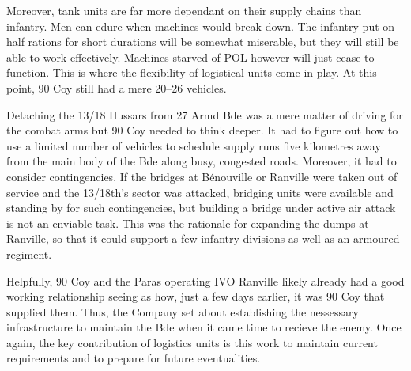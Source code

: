 \documentclass[noraggedright]{turabian-researchpaper}
\begin{document}
Moreover, tank units are far more dependant on their supply chains than infantry.
Men can edure when machines would break down.  The infantry put on half rations 
for short durations will be somewhat miserable, but they will still be able to
work effectively.  Machines starved of POL however will just cease to function.
This is where 
the flexibility of logistical units come in play.  At this point, 90 Coy still 
had a mere 20--26 vehicles.\autocites[Figure has been obtained by 
adding the vehiciles delivered to 90 Coy and subtracting losses.  Range is due
to the fact that 90 Coy's War Diary does not state when vehicles are returned 
serviceable nor do the repairs appear in 27 Armd Bde's REME workshop log of
major jobs completed.][6-14 June 1944]{90wd}[June Diaries Appendix C]{27reme}

Detaching the 13/18 Hussars from 27 Armd Bde was a mere matter of driving for 
the combat arms but 90 Coy needed to think deeper.  It had to figure out how 
to use a limited number of vehicles to schedule supply runs five kilometres 
away from the main body of the Bde along busy, congested roads.  Moreover, it 
had to consider contingencies.  If the bridges at Bénouville or Ranville were 
taken out of service and the 13/18th's sector was attacked,  bridging units 
were available and standing by for such contingencies, but building a bridge 
under active air attack is not an enviable task.  This was the rationale for 
expanding the dumps at Ranville, so that it could support a few infantry 
divisions as well as an armoured regiment. 

Helpfully, 90 Coy and the Paras operating IVO Ranville likely already had a 
good working relationship seeing as 
how, just a few days earlier, it was 90 Coy that supplied them.  Thus, the 
Company set about establishing the nessessary infrastructure to maintain the
Bde when it came time to recieve the enemy.
Once again, the key contribution of logistics units is this work to maintain 
current requirements and to prepare for future eventualities.


\end{document}

